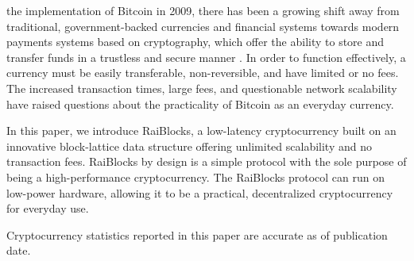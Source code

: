  the implementation of Bitcoin in 2009, there has been a growing shift away from traditional, government-backed currencies and financial systems towards modern payments systems based on cryptography, which offer the ability to store and transfer funds in a trustless and secure manner \cite{Nakamoto_bitcoin:a}. In order to function effectively, a currency must be easily transferable, non-reversible, and have limited or no fees. The increased transaction times, large fees, and questionable network scalability have raised questions about the practicality of Bitcoin as an everyday currency.

In this paper, we introduce RaiBlocks, a low-latency cryptocurrency built on an innovative block-lattice data structure offering unlimited scalability and no transaction fees. RaiBlocks by design is a simple protocol with the sole purpose of being a high-performance cryptocurrency. The RaiBlocks protocol can run on low-power hardware, allowing it to be a practical, decentralized cryptocurrency for everyday use.

Cryptocurrency statistics reported in this paper are accurate as of publication date.